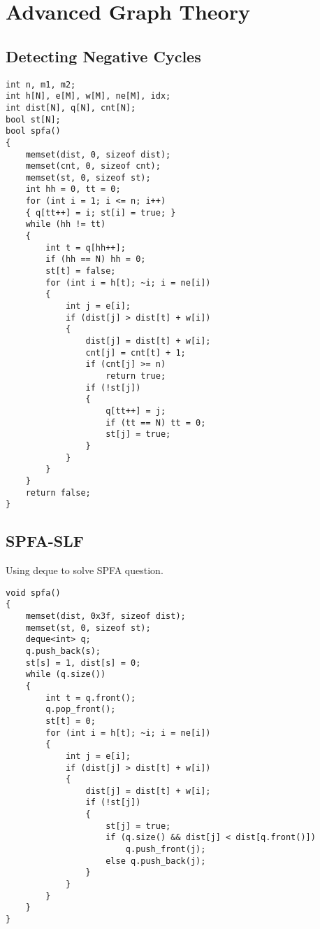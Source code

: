 \chapter{Advanced Graph Theory}\label{chap:AdvancedGraph}
\section{Detecting Negative Cycles}
\begin{lstlisting}
int n, m1, m2;
int h[N], e[M], w[M], ne[M], idx;
int dist[N], q[N], cnt[N];
bool st[N];
bool spfa()
{
    memset(dist, 0, sizeof dist);
    memset(cnt, 0, sizeof cnt);
    memset(st, 0, sizeof st);
    int hh = 0, tt = 0;
    for (int i = 1; i <= n; i++)
    { q[tt++] = i; st[i] = true; }
    while (hh != tt)
    {
        int t = q[hh++];
        if (hh == N) hh = 0;
        st[t] = false;
        for (int i = h[t]; ~i; i = ne[i])
        {
            int j = e[i];
            if (dist[j] > dist[t] + w[i])
            {
                dist[j] = dist[t] + w[i];
                cnt[j] = cnt[t] + 1;
                if (cnt[j] >= n)
                    return true;
                if (!st[j])
                {
                    q[tt++] = j;
                    if (tt == N) tt = 0;
                    st[j] = true;
                }
            }
        }
    }
    return false;
}
\end{lstlisting}
\section{SPFA-SLF}
Using deque to solve SPFA question.
\begin{lstlisting}
void spfa()
{
    memset(dist, 0x3f, sizeof dist);
    memset(st, 0, sizeof st);
    deque<int> q;
    q.push_back(s);
    st[s] = 1, dist[s] = 0;
    while (q.size())
    {
        int t = q.front();
        q.pop_front();
        st[t] = 0;
        for (int i = h[t]; ~i; i = ne[i])
        {
            int j = e[i];
            if (dist[j] > dist[t] + w[i])
            {
                dist[j] = dist[t] + w[i];
                if (!st[j])
                {
                    st[j] = true;
                    if (q.size() && dist[j] < dist[q.front()])
                        q.push_front(j);
                    else q.push_back(j);
                }
            }
        }
    }
}
\end{lstlisting}
